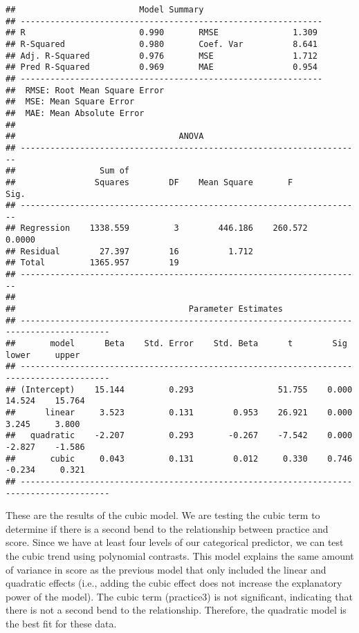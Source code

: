 \documentclass[]{article}
\begin{document}
\begin{verbatim}
##                         Model Summary                         
## -------------------------------------------------------------
## R                       0.990       RMSE               1.309 
## R-Squared               0.980       Coef. Var          8.641 
## Adj. R-Squared          0.976       MSE                1.712 
## Pred R-Squared          0.969       MAE                0.954 
## -------------------------------------------------------------
##  RMSE: Root Mean Square Error 
##  MSE: Mean Square Error 
##  MAE: Mean Absolute Error 
## 
##                                 ANOVA                                 
## ---------------------------------------------------------------------
##                 Sum of                                               
##                Squares        DF    Mean Square       F         Sig. 
## ---------------------------------------------------------------------
## Regression    1338.559         3        446.186    260.572    0.0000 
## Residual        27.397        16          1.712                      
## Total         1365.957        19                                     
## ---------------------------------------------------------------------
## 
##                                   Parameter Estimates                                    
## ----------------------------------------------------------------------------------------
##       model      Beta    Std. Error    Std. Beta      t        Sig      lower     upper 
## ----------------------------------------------------------------------------------------
## (Intercept)    15.144         0.293                 51.755    0.000    14.524    15.764 
##      linear     3.523         0.131        0.953    26.921    0.000     3.245     3.800 
##   quadratic    -2.207         0.293       -0.267    -7.542    0.000    -2.827    -1.586 
##       cubic     0.043         0.131        0.012     0.330    0.746    -0.234     0.321 
## ----------------------------------------------------------------------------------------
\end{verbatim}

These are the results of the cubic model. We are testing the cubic term
to determine if there is a second bend to the relationship between
practice and score. Since we have at least four levels of our
categorical predictor, we can test the cubic trend using polynomial
contrasts. This model explains the same amount of variance in score as
the previous model that only included the linear and quadratic effects
(i.e., adding the cubic effect does not increase the explanatory power
of the model). The cubic term (practice3) is not significant, indicating
that there is not a second bend to the relationship. Therefore, the
quadratic model is the best fit for these data.
\end{document}

